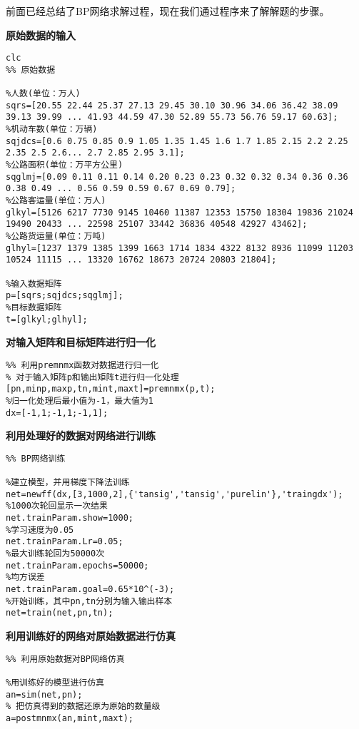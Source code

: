 \documentclass[bwprint]{cumcmthesis}
\begin{document}
前面已经总结了BP网络求解过程，现在我们通过程序来了解解题的步骤\cite{MATLAB}。

\textbf{原始数据的输入}

\lstset{language=MatLab}
\begin{lstlisting}
clc
%% 原始数据

%人数(单位：万人)
sqrs=[20.55 22.44 25.37 27.13 29.45 30.10 30.96 34.06 36.42 38.09 39.13 39.99 ... 41.93 44.59 47.30 52.89 55.73 56.76 59.17 60.63];
%机动车数(单位：万辆)
sqjdcs=[0.6 0.75 0.85 0.9 1.05 1.35 1.45 1.6 1.7 1.85 2.15 2.2 2.25 2.35 2.5 2.6... 2.7 2.85 2.95 3.1];
%公路面积(单位：万平方公里)
sqglmj=[0.09 0.11 0.11 0.14 0.20 0.23 0.23 0.32 0.32 0.34 0.36 0.36 0.38 0.49 ... 0.56 0.59 0.59 0.67 0.69 0.79];
%公路客运量(单位：万人)
glkyl=[5126 6217 7730 9145 10460 11387 12353 15750 18304 19836 21024 19490 20433 ... 22598 25107 33442 36836 40548 42927 43462];
%公路货运量(单位：万吨)
glhyl=[1237 1379 1385 1399 1663 1714 1834 4322 8132 8936 11099 11203 10524 11115 ... 13320 16762 18673 20724 20803 21804];

%输入数据矩阵
p=[sqrs;sqjdcs;sqglmj]; 
%目标数据矩阵
t=[glkyl;glhyl];         
\end{lstlisting}

\textbf{对输入矩阵和目标矩阵进行归一化}

\lstset{language=MatLab}
\begin{lstlisting}
%% 利用premnmx函数对数据进行归一化
% 对于输入矩阵p和输出矩阵t进行归一化处理
[pn,minp,maxp,tn,mint,maxt]=premnmx(p,t); 
%归一化处理后最小值为-1，最大值为1
dx=[-1,1;-1,1;-1,1];                   
\end{lstlisting}

\textbf{利用处理好的数据对网络进行训练}

\lstset{language=MatLab}
\begin{lstlisting}
%% BP网络训练

%建立模型，并用梯度下降法训练
net=newff(dx,[3,1000,2],{'tansig','tansig','purelin'},'traingdx'); 
%1000次轮回显示一次结果
net.trainParam.show=1000; 
%学习速度为0.05              
net.trainParam.Lr=0.05;    
%最大训练轮回为50000次             
net.trainParam.epochs=50000;    
%均方误差       
net.trainParam.goal=0.65*10^(-3); 
%开始训练，其中pn,tn分别为输入输出样本    
net=train(net,pn,tn);                   
\end{lstlisting}

\textbf{利用训练好的网络对原始数据进行仿真}

\lstset{language=MatLab}
\begin{lstlisting}
%% 利用原始数据对BP网络仿真

%用训练好的模型进行仿真
an=sim(net,pn);   
% 把仿真得到的数据还原为原始的数量级        
a=postmnmx(an,mint,maxt); 
\end{lstlisting}
\end{document}
